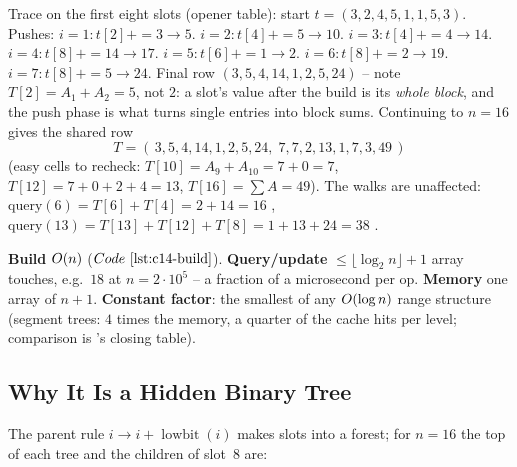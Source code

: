 Trace on the first eight slots (opener table): start \(t=(3,2,4,5,1,1,5,3)\).
Pushes: \(i{=}1\!: t[2]{+}{=}3\to5\). \(i{=}2\!: t[4]{+}{=}5\to10\).
\(i{=}3\!: t[4]{+}{=}4\to14\). \(i{=}4\!: t[8]{+}{=}14\to17\).
\(i{=}5\!: t[6]{+}{=}1\to2\). \(i{=}6\!: t[8]{+}{=}2\to19\).
\(i{=}7\!: t[8]{+}{=}5\to24\).  Final row \((3,5,4,14,1,2,5,24)\) -- note
\(T[2]=A_1{+}A_2=5\), not \(2\): a slot's value after the build is its
\emph{whole block}, and the push phase is what turns single entries into
block sums.  Continuing to \(n=16\) gives the shared row
\[
  T=(\,3,5,4,14,1,2,5,24,\;7,7,2,13,1,7,3,49\,)
\]
(easy cells to recheck: \(T[10]=A_9{+}A_{10}=7{+}0=7\),
\(T[12]=7{+}0{+}2{+}4{=}13\), \(T[16]=\sum A=49\)).  The walks are unaffected:
\(\text{query}(6)=T[6]+T[4]=2+14=16\) \checkmark,
\(\text{query}(13)=T[13]+T[12]+T[8]=1+13+24=38\) \checkmark.

\begin{complexitybox}
\textbf{Build} \(O(n)\) (\(\coderef{c14-build}\)).
\textbf{Query/update} \(\le\lfloor\log_2 n\rfloor+1\) array touches, e.g.\
\(18\) at \(n=2\cdot10^5\) -- a fraction of a microsecond per op.
\textbf{Memory} one \code{long long} array of \(n+1\).
\textbf{Constant factor}: the smallest of any \(O(\log n)\) range
structure (segment trees: \(4\) times the memory, a quarter of the cache
hits per level; comparison is \secref{c14-range}'s closing table).
\end{complexitybox}

\subsection{Why It Is a Hidden Binary Tree}

The parent rule \(i\to i+\operatorname{lowbit}(i)\) makes slots into a
forest; for \(n=16\) the top of each tree and the children of slot~8 are:

